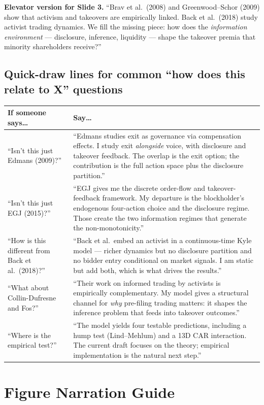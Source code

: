 \documentclass[9pt,a4paper]{extarticle}
\begin{document}
\textbf{Elevator version for Slide 3.} ``Brav et al.\ (2008) and Greenwood--Schor (2009) show that activism and takeovers are empirically linked. Back et al.\ (2018) study activist trading dynamics. We fill the missing piece: how does the \emph{information environment} --- disclosure, inference, liquidity --- shape the takeover premia that minority shareholders receive?''

\subsection{Quick-draw lines for common ``how does this relate to X'' questions}

{\footnotesize
\begin{tabularx}{\textwidth}{@{}P{0.24\textwidth}Y@{}}
\toprule
\textbf{If someone says\ldots} & \textbf{Say\ldots} \\
\midrule
``Isn't this just Edmans (2009)?'' & ``Edmans studies exit as governance via compensation effects. I study exit \emph{alongside} voice, with disclosure and takeover feedback. The overlap is the exit option; the contribution is the full action space plus the disclosure partition.'' \\
``Isn't this just EGJ (2015)?'' & ``EGJ gives me the discrete order-flow and takeover-feedback framework. My departure is the blockholder's endogenous four-action choice and the disclosure regime. Those create the two information regimes that generate the non-monotonicity.'' \\
``How is this different from Back et al.\ (2018)?'' & ``Back et al.\ embed an activist in a continuous-time Kyle model --- richer dynamics but no disclosure partition and no bidder entry conditional on market signals. I am static but add both, which is what drives the results.'' \\
``What about Collin-Dufresne and Fos?'' & ``Their work on informed trading by activists is empirically complementary. My model gives a structural channel for \emph{why} pre-filing trading matters: it shapes the inference problem that feeds into takeover outcomes.'' \\
``Where is the empirical test?'' & ``The model yields four testable predictions, including a hump test (Lind--Mehlum) and a 13D CAR interaction. The current draft focuses on the theory; empirical implementation is the natural next step.'' \\
\bottomrule
\end{tabularx}
}

\section{Figure Narration Guide}
\end{document}

